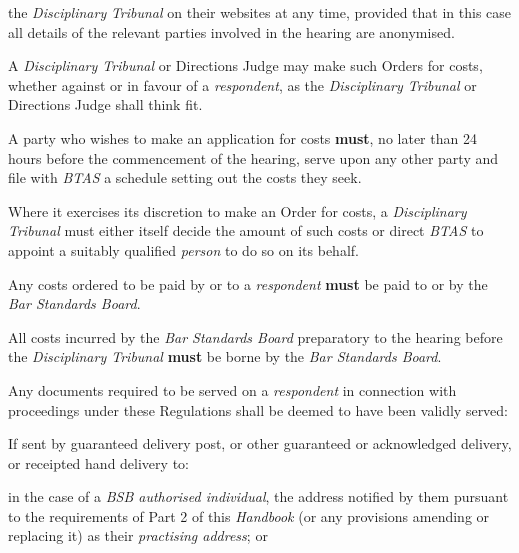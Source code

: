 the \emph{Disciplinary} \emph{Tribunal} on their websites at any time,
provided that in this case all details of the relevant parties involved
in the hearing are anonymised.\ln
{}\par
{}
A \emph{Disciplinary Tribunal} or Directions Judge may make such Orders
for costs, whether against or in favour of a \emph{respondent}, as
the \emph{Disciplinary Tribunal} or Directions Judge shall think fit.\\
\par
A party who wishes to make an application for costs  \textcolor{myred}{\textbf{must}}, no later than
24 hours before the commencement of the hearing, serve upon any other
party and file with \emph{BTAS }a schedule setting out the costs they
seek.\\
\par
Where it exercises its discretion to make an Order for costs,
a \emph{Disciplinary Tribunal }must either itself decide the amount of
such costs or direct \emph{BTAS }to appoint a suitably
qualified \emph{person }to do so on its behalf.\\
\par
Any costs ordered to be paid by or to a \emph{respondent}  \textcolor{myred}{\textbf{must}} be paid
to or by the \emph{Bar Standards Board}.\\
\par
All costs incurred by the \emph{Bar Standards Board} preparatory to the
hearing before the \emph{Disciplinary Tribunal}  \textcolor{myred}{\textbf{must}} be borne by
the \emph{Bar Standards Board}.\\
\par
{}
Any documents required to be served on a \emph{respondent} in connection
with proceedings under these Regulations shall be deemed to have been
validly served:\\\nl \item If sent by guaranteed delivery post, or other guaranteed or
acknowledged delivery, or receipted hand delivery to:\\\al
\item in the case of a \emph{BSB authorised individual}, the address
notified by them pursuant to the requirements of Part 2 of
this \emph{Handbook} (or any provisions amending or replacing it) as
their \emph{practising address}; or\\
